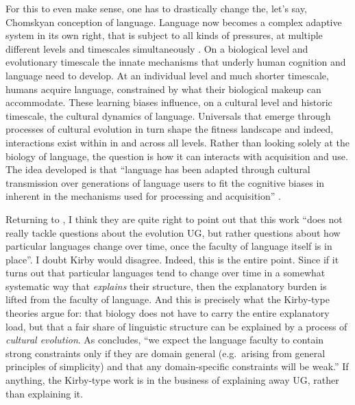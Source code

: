 \documentclass{../src/bcthesispart}
\begin{document}
For this to even make sense, one has to drastically change the, let's say, Chomskyan conception of language.
Language now becomes a complex adaptive system in its own right, that is subject to all kinds of pressures, at multiple different levels and timescales simultaneously \parencite{Kirby2002,Christiansen2016a,Smith2014,Kirby2017,Steels2016}.
On a biological level and evolutionary timescale the innate mechanisms that underly human cognition and language need to develop. 
At an individual level and much shorter timescale, humans acquire language, constrained by what their biological makeup can accommodate.
These learning biases influence, on a cultural level and historic timescale, the cultural dynamics of language.
Universals that emerge through processes of cultural evolution in turn shape the fitness landscape and indeed, interactions exist within in and across all levels.
Rather than looking solely at the biology of language, the question is how it can interacts with acquisition and use.
The idea developed is that “language has been adapted through cultural transmission over generations of language users to fit the cognitive biases in inherent in the mechanisms used for processing and acquisition” \parencite[12]{Christiansen2016}. \nocite{Tomasello1999}




Returning to \textcite{Berwick2017}, I think they are quite right to point out that this work “does not really tackle questions about the evolution UG, but rather questions about how particular languages change over time, once the faculty of language itself is in place”.
I doubt Kirby would disagree.
Indeed, this is the entire point.
Since if it turns out that particular languages tend to change over time in a somewhat systematic way that \emph{explains} their structure, then the explanatory burden is lifted from the faculty of language.
And this is precisely what the Kirby-type theories argue for: that biology does not have to carry the entire explanatory load, but that a fair share of linguistic structure can be explained by a process of \emph{cultural evolution}.
As \textcite{Kirby2017} concludes, “we expect the language faculty to contain strong constraints only if they are domain general (e.g.\ arising from general principles of simplicity) and that any domain-specific constraints will be weak.”
If anything, the Kirby-type work is in the business of explaining away UG, rather than explaining it.
\end{document}
